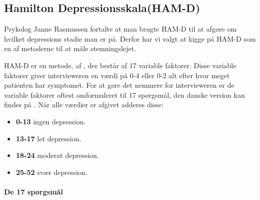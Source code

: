 \subsection{Hamilton Depressionsskala(HAM-D)}
Psykolog Janne Rasmussen fortalte at man brugte HAM-D til at afgøre om hvilket depressions stadie man er på.\cite[Afsnit 1.3, Møde med Psykolog Janne Rasmussen]{faelles}
Derfor har vi valgt at kigge på HAM-D som en af metoderne til at måle stemningslejet.

HAM-D er en metode, af \citet{ham_d}, der består af 17 variable faktorer.
Disse variable faktorer giver intervieweren en værdi på 0-4 eller 0-2 alt efter hvor meget patienten har symptomet.
For at gøre det nemmere for intervieweren er de variable faktorer oftest omformuleret til 17 spørgsmål, den danske version kan findes på \citet{ham_d_dansk}.
Når alle værdier er afgivet adderes disse:
\begin{itemize}
	\item \textbf{0-13} ingen depression.
	\item \textbf{13-17} let depression.
	\item \textbf{18-24} moderat depression.
	\item \textbf{25-52} svær depression.
\end{itemize}

\paragraph{De 17 spørgsmål}

